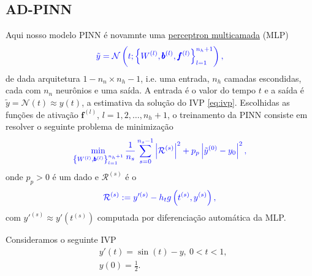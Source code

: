 \subsection{AD-PINN}

Aqui nosso modelo PINN é novamnte uma \href{https://notaspedrok.com.br/notas/RedesNeuraisArtificiais/cap_mlp_sec_modelo.html}{perceptron multicamada} (MLP)
\begin{equation}\color{blue}\tilde{y} = \mathcal{N}\left(t; \left\{W^{(l)}, \pmb{b}^{(l)}, \pmb{f}^{(l)}\right\}_{l=1}^{n_h+1}\right),
\end{equation}
de dada arquitetura $1 - n_n\times n_h - 1$, i.e. uma entrada, $n_h$ camadas escondidas, cada com $n_n$ neurônios e uma saída. A entrada é o valor do tempo $t$ e a saída é $\tilde{y} = \mathcal{N}(t) \approx y(t)$, a estimativa da solução do IVP \eqref{eq:ivp}. Escolhidas as funções de ativação $\pmb{f}^{(l)}$, $l = 1, 2, \dotsc, n_h+1$, o treinamento da PINN consiste em resolver o seguinte problema de minimização
\begin{equation}\color{blue}\min_{\left\{W^{(l)}, \pmb{b}^{(l)}\right\}_{l=1}^{n_h+1}} \frac{1}{n_s}\sum_{s=0}^{n_s-1}\left|\mathcal{R}^{(s)}\right|^2 + p_p\left|\tilde{y}^{(0)} - y_0\right|^2,
\end{equation}
onde $p_p>0$ é um dado  e $\mathcal{R}^{(s)}$ é o 
\begin{equation}\color{blue}\mathcal{R}^{(s)} := y'^{(s)} - h_tg\left(t^{(s)}, y^{(s)}\right),
\end{equation}
com $y'^{(s)} \approx y'\left(t^{(s)}\right)$ computada por diferenciação automática da MLP.

\begin{ex}
  Consideramos o seguinte IVP
  \begin{subequations}
    \begin{align}
      &y'(t) = \sin(t) - y, ~0 < t < 1,\\
      &y(0) = \frac{1}{2}.
    \end{align}
  \end{subequations}
\end{ex}

